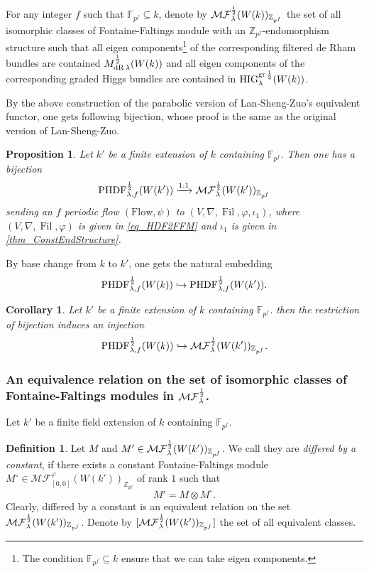 \documentclass[12pt,twoside]{book}
\theoremstyle{plain}
\newtheorem{proposition}[proposition]{Proposition}
\newtheorem{corollary}[corollary]{Corollary}
\theoremstyle{definition}
\newtheorem{definition}[definition]{Definition}
\theoremstyle{remark}
\newcommand{\bF}{{\mathbb F}}
\newcommand{\bZ}{{\mathbb Z}}
\DeclareMathOperator\Fil{Fil}
\newcommand{\MF}{\mathcal{MF}}
\numberwithin{equation}{section}
\def\High{{\mathrm{HIG}^{{\rm gr}\,{1\over 2}}_{\lambda}}}
\def\MdRh{{M^{{1\over 2}}_{{\rm dR}\,\lambda}}}
\def\MFh{\MF^{{1\over 2}}_{\lambda}}
\def\PHDFhf{\mathrm{PHDF}^{{1\over 2}}_{\lambda,f}}
\def\Flow{\mathrm{Flow}}
\begin{document}
For any integer $f$ such that $\bF_{p^f}\subseteq k$, denote by \emph{$\MFh(W(k))_{\bZ_{p^f}}$} the set of all isomorphic classes of Fontaine-Faltings module with an $\bZ_{p^f}$-endomorphism structure such that all eigen components\footnote{The condition $\bF_{p^f}\subseteq k$ ensure that we can take eigen components.} of the corresponding filtered de Rham bundles are contained $\MdRh(W(k))$ and all eigen components of the corresponding graded Higgs bundles are contained in $\High(W(k))$.


By the above construction of the parabolic version of Lan-Sheng-Zuo's equivalent functor, one gets following bijection, whose proof is the same as the original version of Lan-Sheng-Zuo.
\begin{proposition} Let $k'$ be a finite extension of $k$ containing $\bF_{p^f}$. Then one has a bijection
\[\PHDFhf(W(k')) \xrightarrow{1:1} \MFh(W(k'))_{\bZ_{p^f}}\]
sending an $f$ periodic flow $(\Flow,\psi)$ to $(V,\nabla,\Fil,\varphi,\iota_1)$, where $(V,\nabla,\Fil,\varphi)$ is given in \eqref{eq_HDF2FFM} and $\iota_1$ is given in \autoref{thm_ConstEndStructure}.
\end{proposition}

By base change from $k$ to $k'$, one gets the natural embedding
\[\PHDFhf(W(k)) \hookrightarrow \PHDFhf(W(k')).\]
\begin{corollary}
Let $k'$ be a finite extension of $k$ containing $\bF_{p^f}$. then the restriction of bijection induces an injection
\begin{equation}\label{eq_PHDFHfW2MFhf}
\PHDFhf(W(k)) \hookrightarrow \MFh(W(k'))_{\bZ_{p^f}}.
\end{equation}
\end{corollary}


\subsubsection{An equivalence relation on the set of isomorphic classes of Fontaine-Faltings modules in $\MFh$.} \label{subsec_HDF2FFM}

Let $k'$ be a finite field extension of $k$ containing $\bF_{p^f}$.

\begin{definition} \label{def_diffByConstantFFM}
Let $M$ and $M' \in \MFh(W(k'))_{\bZ_{p^f}}$. We call they are \emph{differed by a constant}, if there exists a constant Fontaine-Faltings module $M^\circ \in \MF_{[0,0]}^{\varphi}(W(k'))_{\bZ_{p^{f}}}$ of rank $1$ such that
\[M' = M \otimes M^\circ.\]
Clearly, differed by a constant is an equivalent relation on the set $\MFh(W(k'))_{\bZ_{p^f}}$. Denote by \emph{$[\MFh(W(k'))_{\bZ_{p^f}}]$} the set of all equivalent classes.
\end{definition}
\end{document}
